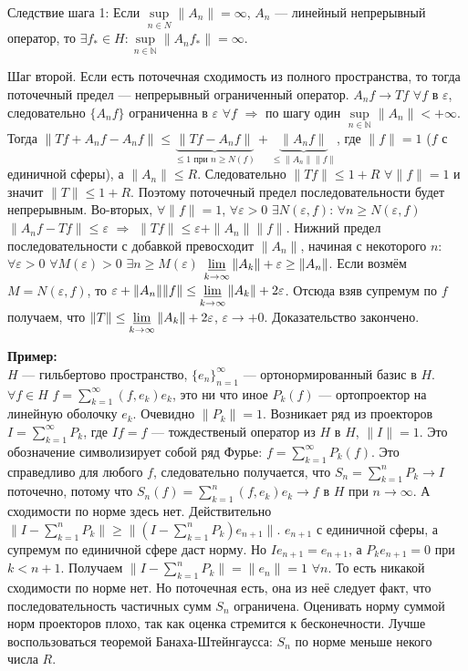 \documentclass[12pt]{article}
\begin{document}
Следствие шага 1: Если $\sup\limits_{n \in N}\|A_n\| = \infty$, $A_n$ --- линейный непрерывный оператор, то $\exists f_* \in H\colon
\sup \limits_{n \in \mathbb N}\|A_n f_*\| = \infty$.

Шаг второй. Если есть поточечная сходимость из полного пространства, то тогда поточечный предел --- непрерывный ограниченный оператор.
$A_n f \to T f$ $\forall f$ в $\varepsilon$, следовательно $\{A_n f\}$ ограниченна в $\varepsilon$ $\forall f$ $\Rightarrow$ по шагу один $\sup \limits_{n \in
\mathbb N}\|A_n\| < +\infty$.
Тогда $\|Tf + A_n f - A_n f\| \le \underbrace{\|Tf - A_n f\|}_{\le 1\text{ при } n \ge N(f)} + \underbrace{\|A_n f\|}_{\le \|A_n\| \|f\|}$, где $\|f\| = 1$ ($f$ с
единичной сферы), а $\|A_n\| \le R$.
Следовательно $\|Tf\| \le 1 + R$ $\forall \|f\| = 1$ и значит $\|T\| \le 1 + R$.
Поэтому поточечный предел последовательности будет непрерывным.
Во-вторых, $\forall \|f\| = 1$, $\forall \varepsilon > 0$ $\exists N(\varepsilon, f)$: $\forall n \ge N(\varepsilon, f)$ $\|A_n f - Tf\| \le \varepsilon$
$\Rightarrow$ $\|Tf\| \le \varepsilon + \|A_n\|\|f\|$.
Нижний предел последовательности с добавкой превосходит $\|A_n\|$, начиная с некоторого $n$:
$\forall \varepsilon > 0$ $\forall M(\varepsilon) > 0$ $\exists n \ge M(\varepsilon)$ $\varliminf\limits_{k \to \infty}\|A_k\| + \varepsilon \ge \|A_n\|$.
Если возмём $M = N(\varepsilon, f)$, то $\varepsilon + \|A_n\| \|f\| \le \varliminf\limits_{k \to \infty}\|A_k\| + 2 \varepsilon$.
Отсюда взяв супремум по $f$ получаем, что $\|T\| \le \varliminf\limits_{k \to \infty}\|A_k\| + 2 \varepsilon$, $\varepsilon \to +0$.
Доказательство закончено.

\textbf{Пример:}\\
$H$ --- гильбертово пространство, $\{e_n\}_{n = 1}^{\infty}$ --- ортонормированный базис в $H$.
$\forall f \in H$ $f = \sum\limits_{k = 1}^{\infty}(f, e_k)e_k$, это ни что иное $P_k(f)$ --- ортопроектор на линейную оболочку $e_k$.
Очевидно $\|P_k\| = 1$.
Возникает ряд из проекторов $I = \sum\limits_{k = 1}^{\infty}P_k$, где $If = f$ --- тождественый оператор из $H$ в $H$, $\|I\| = 1$.
Это обозначение символизирует собой ряд Фурье: $f = \sum\limits_{k = 1}^{\infty}P_k(f)$.
Это справедливо для любого $f$, следовательно получается, что $S_n = \sum\limits_{k = 1}^{n}P_k \to I$ поточечно, потому что
$S_n(f) = \sum\limits_{k = 1}^{n}(f, e_k)e_k \to f$ в $H$ при $n \to \infty$.
А сходимости по норме здесь нет.
Действительно $\|I - \sum\limits_{k = 1}^{n}P_k\| \ge \|(I - \sum\limits_{k = 1}^{n}P_k)e_{n + 1}\|$.
$e_{n+  1}$ с единичной сферы, а супремум по единичной сфере даст норму.
Но $Ie_{n + 1} = e_{n + 1}$, а $P_k e_{n + 1} = 0$ при $k < n + 1$.
Получаем $\|I - \sum\limits_{k = 1}^{n}P_k\| = \|e_n\| = 1$ $\forall n$.
То есть никакой сходимости по норме нет.
Но поточечная есть, она из неё следует факт, что последовательность частичных сумм $S_n$ ограничена.
Оценивать норму суммой норм проекторов плохо, так как оценка стремится к бесконечности.
Лучше воспользоваться теоремой Банаха-Штейнгаусса: $S_n$ по норме меньше некого числа $R$.
\end{document}
